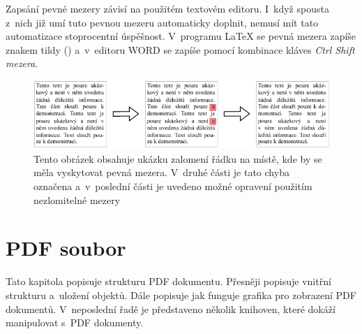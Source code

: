 Zapsání pevné mezery závisí na použitém textovém editoru. I~když spousta z~nich
již umí tuto pevnou mezeru automaticky doplnit, nemusí mít tato automatizace
stoprocentní úspěšnost. V~programu {\LaTeX} se pevná mezera zapíše znakem tildy
(\texttildelow) a~v~editoru WORD se zapíše pomocí kombinace kláves
\emph{Ctrl Shift mezera}.

\begin{figure}[H]
    \centering
    \includegraphics[width=\linewidth]{obrazky-figures/hard_space_example.pdf}
    \caption{
        Tento obrázek obsahuje ukázku zalomení řádku na místě, kde by se měla
        vyskytovat pevná mezera. V~druhé části je tato chyba označena a~v~poslední
        části je uvedeno možné opravení použitím nezlomitelné mezery
    }
    \label{pic_hard_space}
\end{figure}








\chapter{PDF soubor} \label{PDF_file}
Tato kapitola popisuje strukturu PDF dokumentu. Přesněji popisuje vnitřní
strukturu a~uložení objektů. Dále popisuje jak funguje grafika pro zobrazení
PDF dokumentů. V~neposlední řadě je představeno několik knihoven, které
dokáží manipulovat s~PDF dokumenty.



